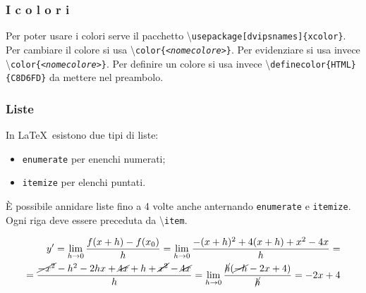 \documentclass{article}     %
\begin{document}
\subsubsection{{\color{yellow} I} {\color{orange} c}{\color{red} o}{\color{magenta} l}{\color{purple} o}{\color{blue} r}{\color{teal} i}}
Per poter usare i colori serve il pacchetto \textbackslash\texttt{usepackage[dvipsnames]\{xcolor\}}. Per cambiare il colore si usa \textbackslash\texttt{color\{\textit{\textless nomecolore\textgreater}\}}. Per evidenziare si usa invece \textbackslash\texttt{color\{\textit{\textless nomecolore\textgreater}\}}. Per definire un colore si usa invece \textbackslash\texttt{definecolor\{HTML\}\{{\color{zun}C8D6FD}\}} da mettere nel preambolo.
\subsubsection{Liste}
In \LaTeX\ esistono due tipi di liste:
\begin{itemize}[leftmargin=*]
    \item \texttt{enumerate} per enenchi numerati;
    \item \texttt{itemize} per elenchi puntati.
\end{itemize}
È possibile annidare liste fino a 4 volte anche anternando \texttt{enumerate} e \texttt{itemize}. Ogni riga deve essere preceduta da \textbackslash\texttt{item}.

\[\begin{aligned}
    y'= \lim_{h\to 0} \frac{f(x+h)-f(x_0)}{h}= \lim_{h\to 0}\frac{-(x+h)^2+4(x+h)+x^2-4x}{h}=\\=\frac{\cancel{-x^2}-h^2-2hx+\cancel{4x}+h+\cancel{x^2}-\cancel{4x}}{h}= \lim_{h\to 0}\frac{\cancel{h}(\cancel{-h}-2x+4)}{\cancel{h}}=-2x+4
\end{aligned}\]
\end{document}
